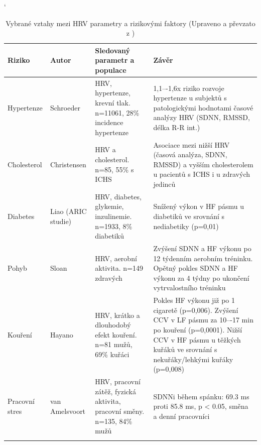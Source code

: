 \begin{table}[h]
	\catcode`
	\scriptsize
	\begin{center}
		\caption[HRV a rizikové faktory]{Vybrané vztahy mezi HRV parametry a rizikovými faktory
			(Upraveno a převzato z \cite{Pumprla2014,Thayer2009})}
		\label{tab:hrv_factors}
		\vspace{1ex}
		\begin{tabular}{|p{1.3cm}|p{1.7cm}|p{4.5cm}|p{5.5cm}|}
			\noalign{\hrule height 2pt}
			\textbf{Riziko} & \textbf{Autor}     & \textbf{Sledovaný parametr a populace}                                  & \textbf{Závěr}                                                                                                                                                                                  \\ \hline
			Hypertenze      & Schroeder          & HRV, hypertenze, krevní tlak. n=11061, 28\% incidence hypertenze        & 1,1–-1,6x riziko rozvoje hypertenze u subjektů s patologickými hodnotami časové analýzy HRV (SDNN, RMSSD, délka R-R int.)                                                                       \\ \hline
			Cholesterol     & Christensen        & HRV a cholesterol. n=85, 55\% s ICHS                                    & Asociace mezi nižší HRV (časová analýza, SDNN, RMSSD) a vyšším cholesterolem u pacientů s ICHS i u zdravých jedinců                                                                             \\ \hline
			Diabetes        & Liao (ARIC studie) & HRV, diabetes, glykemie, inzulinemie. n=1933, 8\% diabetiků             & Snížený výkon v HF pásmu u diabetiků ve srovnání s nediabetiky (p=0,01)                                                                                                                         \\ \hline
			Pohyb           & Sloan              & HRV, aerobní aktivita. n=149 zdravých                                   & Zvýšení SDNN a HF výkonu po 12 týdenním aerobním tréninku. Opětný pokles SDNN a HF výkonu za 4 týdny po ukončení vytrvalostního tréninku                                                        \\ \hline
			Kouření         & Hayano             & HRV, krátko a dlouhodobý efekt kouření. n=81 mužů, 69\% kuřáci          & Pokles HF výkonu již po 1 cigaretě (p=0,006). Zvýšení CCV v LF pásmu za 10–-17 min po kouření (p=0,0001). Nižší CCV v HF pásmu u těžkých kuřáků ve srovnání s nekuřáky/lehkými kuřáky (p=0,008) \\ \hline
			Pracovní stres  & van Amelsvoort     & HRV, pracovní zátěž, fyzická aktivita, pracovní směny. n=135, 84\% mužů & SDNNi během spánku: 69.3 ms proti 85.8 ms, p < 0.05, směna a denní pracovníci                                                                                                                   \\ \noalign{\hrule height 2pt}
		\end{tabular}
	\end{center}
\end{table}